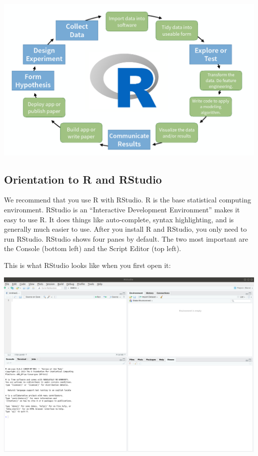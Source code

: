 \documentclass[]{article}
\begin{document}
\begin{center}\includegraphics[width=0.9\linewidth]{images/data-science-R} \end{center}

\hypertarget{orientation-to-r-and-rstudio}{%
\subsection{Orientation to R and
RStudio}\label{orientation-to-r-and-rstudio}}

We recommend that you use R with RStudio. R is the base statistical
computing environment. RStudio is an ``Interactive Development
Environment'' makes it easy to use R. It does things like auto-complete,
syntax highlighting, and is generally much easier to use. After you
install R and RStudio, you only need to run RStudio. RStudio shows four
panes by default. The two most important are the Console (bottom left)
and the Script Editor (top left).

This is what RStudio looks like when you first open it:

\begin{center}\includegraphics[width=0.9\linewidth]{images/RStudio} \end{center}
\end{document}
